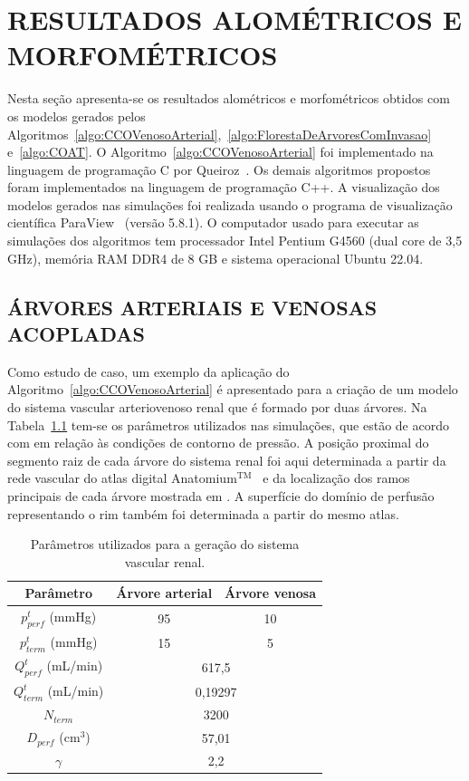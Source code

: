 \chapter{RESULTADOS ALOMÉTRICOS E MORFOMÉTRICOS}\label{sec:resultados-alometricos-morfometricos}

Nesta seção apresenta-se os resultados alométricos e morfométricos obtidos com os modelos gerados pelos Algoritmos~\ref{algo:CCOVenosoArterial},~\ref{algo:FlorestaDeArvoresComInvasao} e~\ref{algo:COAT}.
O Algoritmo~\ref{algo:CCOVenosoArterial} foi implementado na linguagem de programação C por 
Queiroz~\cite{Queiroz2013}. Os demais algoritmos propostos foram implementados na linguagem 
de programação C++. 
A visualização dos modelos gerados nas simulações foi realizada usando o programa de visualização científica 
ParaView~\cite{Ayachit2015} (versão 5.8.1).
O computador usado para executar as simulações dos algoritmos tem processador Intel Pentium G4560 (dual core 
de 3,5 GHz), memória RAM DDR4 de 8 GB e sistema operacional Ubuntu 22.04.

\section{ÁRVORES ARTERIAIS E VENOSAS ACOPLADAS}\label{sec:resultados-arvores-acopladas}

Como estudo de caso, um exemplo da aplicação do Algoritmo~\ref{algo:CCOVenosoArterial} é apresentado  
para a criação de um modelo do sistema vascular arteriovenoso renal que é formado por duas árvores. 
Na Tabela~\ref{tab:parametros-modelo-rim} tem-se os parâmetros utilizados nas simulações, 
que estão de acordo com \cite{Kretowski2004} em relação às condi\c{c}\~oes de contorno de pressão.
A posição proximal do segmento raiz de cada árvore do sistema renal foi aqui 
determinada a partir da rede vascular do atlas digital Anatomium$^{\text{TM}}$~\cite{Langenkamp2015} 
e da localização dos ramos principais de cada árvore mostrada em \cite{Kretowski2004}.
A superfície do domínio de perfusão representando o rim também foi determinada a partir do mesmo atlas.

\begin{table}[!htb]
\centering
\captiondelim{: }
\caption{Parâmetros utilizados para a gera\c{c}\~ao do sistema vascular renal.}
 \begin{tabular}{|c|cc|}
\hline
Parâmetro             &Árvore arterial & Árvore venosa\\
\hline
   $p^t_{perf}$ (mmHg) & 95 & 10 \\
   $p^t_{term}$ (mmHg) & 15 & 5 \\
\hline
   $Q^t_{perf}$ (mL/min) & \multicolumn{2}{|c|}{617,5}\\
$Q^t_{term}$ (mL/min) & \multicolumn{2}{|c|}{0,19297}\\
 $N_{term}$ & \multicolumn{2}{|c|}{3200}\\
$D_{perf}$  (cm$^3$) & \multicolumn{2}{|c|}{57,01} \\
$\gamma$  & \multicolumn{2}{|c|}{2,2} \\
\hline
\end{tabular}
\label{tab:parametros-modelo-rim}
\end{table}

